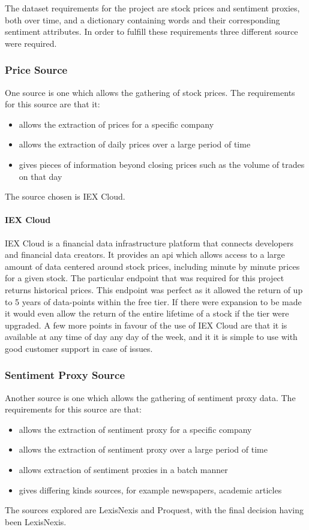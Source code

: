 The dataset requirements for the project are stock prices and sentiment proxies, both over time, and a dictionary containing words and their corresponding sentiment attributes. In order to fulfill these requirements three different source were required.

\subsubsection{Price Source}

One source is one which allows the gathering of stock prices. The requirements for this source are that it:
\begin{itemize}
    \item allows the extraction of prices for a specific company
    \item allows the extraction of daily prices over a large period of time
    \item gives pieces of information beyond closing prices such as the volume of trades on that day
\end{itemize}
The source chosen is IEX Cloud.

\paragraph{IEX Cloud}

IEX Cloud is a financial data infrastructure platform that connects developers and financial data creators. It provides an api which allows access to a large amount of data centered around stock prices, including minute by minute prices for a given stock. The particular endpoint that was required for this project returns historical prices. This endpoint was perfect as it allowed the return of up to 5 years of data-points within the free tier. If there were expansion to be made it would even allow the return of the entire lifetime of a stock if the tier were upgraded. A few more points in favour of the use of IEX Cloud are that it is available at any time of day any day of the week, and it it is simple to use with good customer support in case of issues.

\subsubsection{Sentiment Proxy Source}

Another source is one which allows the gathering of sentiment proxy data. The requirements for this source are that:
\begin{itemize}
    \item allows the extraction of sentiment proxy for a specific company
    \item allows the extraction of sentiment proxy over a large period of time
    \item allows extraction of sentiment proxies in a batch manner
    \item gives differing kinds sources, for example newspapers, academic articles
\end{itemize}
The sources explored are LexisNexis and Proquest, with the final decision having been LexisNexis.

